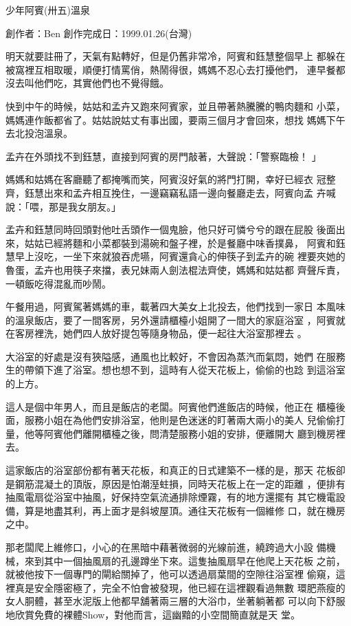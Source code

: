 



少年阿賓(卅五)溫泉

創作者：Ben
創作完成日：1999.01.26(台灣)


明天就要註冊了，天氣有點轉好，但是仍舊非常冷，阿賓和鈺慧整個早上
都躲在被窩裡互相取暖，順便打情罵俏，熱鬧得很，媽媽不忍心去打擾他們，
連早餐都沒去叫他們吃，其實他們也不覺得餓。

快到中午的時候，姑姑和孟卉又跑來阿賓家，並且帶著熱騰騰的鴨肉麵和
小菜，媽媽連作飯都省了。姑姑說姑丈有事出國，要兩三個月才會回來，想找
媽媽下午去北投泡溫泉。

孟卉在外頭找不到鈺慧，直接到阿賓的房門敲著，大聲說：「警察臨檢！
」

媽媽和姑媽在客廳聽了都掩嘴而笑，阿賓沒好氣的將門打開，幸好已經衣
冠整齊，鈺慧出來和孟卉相互挽住，一邊竊竊私語一邊向餐廳走去，阿賓向孟
卉喊說：「喂，那是我女朋友。」

孟卉和鈺慧同時回頭對他吐舌頭作一個鬼臉，他只好可憐兮兮的跟在屁股
後面出來，姑姑已經將麵和小菜都裝到湯碗和盤子裡，於是餐廳中味香撲鼻，
阿賓和鈺慧早上沒吃，一坐下來就狼吞虎嚥，阿賓還貪心的伸筷子到孟卉的碗
裡要夾她的魯蛋，孟卉也用筷子來擋，表兄妹兩人劍法棍法齊使，媽媽和姑姑都
齊聲斥責，一頓飯吃得混亂而吵鬧。

午餐用過，阿賓駕著媽媽的車，載著四大美女上北投去，他們找到一家日
本風味的溫泉飯店，要了一間客房，另外還請櫃檯小姐開了一間大的家庭浴室
，阿賓就在客房裡洗，她們四人放好提包等隨身物品，便一起往大浴室那裡去
。

大浴室的好處是沒有狹隘感，通風也比較好，不會因為蒸汽而氣悶，她們
在服務生的帶領下進了浴室。想也想不到，這時有人從天花板上，偷偷的也踗
到這浴室的上方。

這人是個中年男人，而且是飯店的老闆。阿賓他們進飯店的時候，他正在
櫃檯後面，服務小姐在為他們安排浴室，他則是色迷迷的盯著兩大兩小的美人
兒偷偷打量，他等阿賓他們離開櫃檯之後，問清楚服務小姐的安排，便離開大
廳到機房裡去。

這家飯店的浴室部份都有著天花板，和真正的日式建築不一樣的是，那天
花板卻是鋼筋混凝土的頂版，原因是怕潮溼蛀損，同時天花板上在一定的距離
，便排有抽風電扇從浴室中抽風，好保持空氣流通排除煙霧，有的地方還擺有
其它機電設備，算是地盡其利，再上面才是斜坡屋頂。通往天花板有一個維修
口，就在機房之中。

那老闆爬上維修口，小心的在黑暗中藉著微弱的光線前進，繞跨過大小設
備機械，來到其中一個抽風扇的孔邊蹲坐下來。這隻抽風扇早在他爬上天花板
之前，就被他按下一個專門的閘給關掉了，他可以透過扇葉間的空隙往浴室裡
偷窺，這裡真是安全隱密極了，完全不怕會被發現，他已經在這裡觀看過無數
環肥燕瘦的女人胴體，甚至水泥版上他都早舖著兩三層的大浴巾，坐著躺著都
可以向下舒服地欣賞免費的裸體Show，對他而言，這幽黯的小空間簡直就是天
堂。

